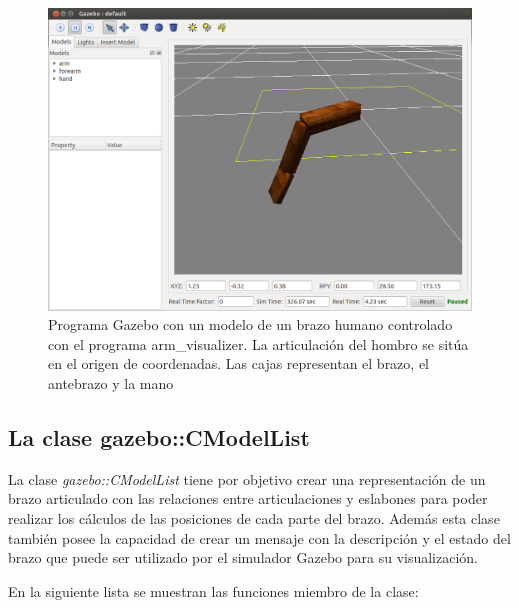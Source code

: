\documentclass[12pt, a4paper]{report}
\begin{document}
\begin{figure}[h]
	\centering
		\includegraphics[scale=0.3]{../img/arm_visualizer.png} 
	\caption[Programa Gazebo con un modelo de un brazo humano]{Programa Gazebo con un modelo de un brazo humano controlado con el programa arm\_visualizer. La articulación del hombro se sitúa en el origen de coordenadas. Las cajas representan el brazo, el antebrazo y la mano} 
	\label{fig: arm_visualizer}
\end{figure}

\subsection{La clase gazebo::CModelList}

La clase \textit{gazebo::CModelList} tiene por objetivo crear una representación de un brazo articulado con las relaciones entre articulaciones y eslabones para poder realizar los cálculos de las posiciones de cada parte del brazo. Además esta clase también posee la capacidad de crear un mensaje con la descripción y el estado del brazo que puede ser utilizado por el simulador Gazebo para su visualización.

En la siguiente lista se muestran las funciones miembro de la clase:
\end{document}
